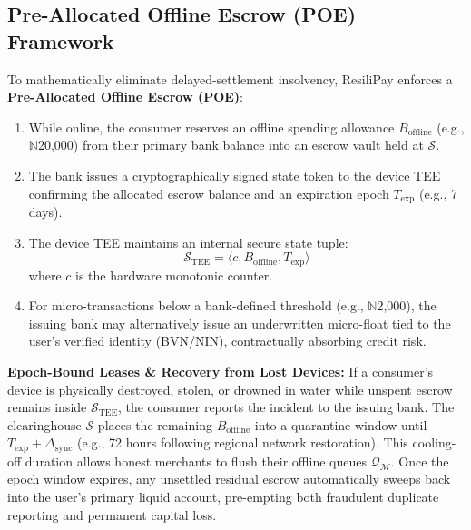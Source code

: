 \documentclass[conference]{IEEEtran}
\begin{document}
\subsection{Pre-Allocated Offline Escrow (POE) Framework}
To mathematically eliminate delayed-settlement insolvency, ResiliPay enforces a \textbf{Pre-Allocated Offline Escrow (POE)}:
\begin{enumerate}
    \item While online, the consumer reserves an offline spending allowance $B_{\text{offline}}$ (e.g., $\mathbb{N}$20,000) from their primary bank balance into an escrow vault held at $\mathcal{S}$.
    \item The bank issues a cryptographically signed state token to the device TEE confirming the allocated escrow balance and an expiration epoch $T_{\text{exp}}$ (e.g., 7 days).
    \item The device TEE maintains an internal secure state tuple:
    \begin{equation}
    \mathcal{S}_{\text{TEE}} = \langle c, B_{\text{offline}}, T_{\text{exp}} \rangle
    \end{equation}
    where $c$ is the hardware monotonic counter.
    \item For micro-transactions below a bank-defined threshold (e.g., $\mathbb{N}$2,000), the issuing bank may alternatively issue an underwritten micro-float tied to the user's verified identity (BVN/NIN), contractually absorbing credit risk.
\end{enumerate}

\smallskip
\noindent\textbf{Epoch-Bound Leases \& Recovery from Lost Devices:}
If a consumer's device is physically destroyed, stolen, or drowned in water while unspent escrow remains inside $\mathcal{S}_{\text{TEE}}$, the consumer reports the incident to the issuing bank. The clearinghouse $\mathcal{S}$ places the remaining $B_{\text{offline}}$ into a quarantine window until $T_{\text{exp}} + \Delta_{\text{sync}}$ (e.g., 72 hours following regional network restoration). This cooling-off duration allows honest merchants to flush their offline queues $\mathcal{Q}_{\mathcal{M}}$. Once the epoch window expires, any unsettled residual escrow automatically sweeps back into the user's primary liquid account, pre-empting both fraudulent duplicate reporting and permanent capital loss.
\end{document}
